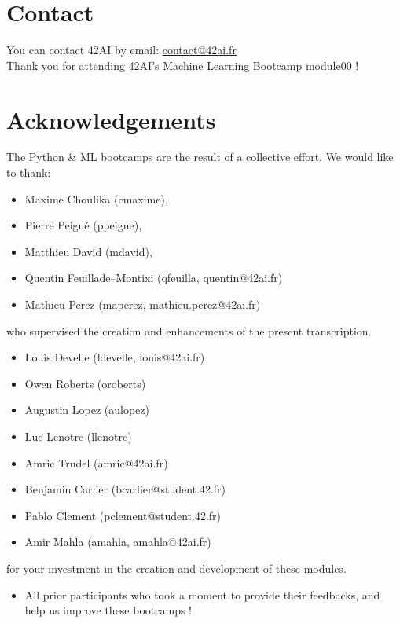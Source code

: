 \section*{Contact}
You can contact 42AI by email: \href{mailto:contact@42ai.fr}{contact@42ai.fr}\\
\newline
Thank you for attending 42AI's Machine Learning Bootcamp module00 !

\section*{Acknowledgements}
The Python \& ML bootcamps are the result of a collective effort. We would like to thank:\\
\begin{itemize}
  \item Maxime Choulika (cmaxime),
  \item Pierre Peigné (ppeigne),
  \item Matthieu David (mdavid),
  \item Quentin Feuillade--Montixi (qfeuilla, quentin@42ai.fr)
  \item Mathieu Perez (maperez, mathieu.perez@42ai.fr)
\end{itemize}
who supervised the creation and enhancements of the present transcription.\\
\newline
\begin{itemize}
  \item Louis Develle (ldevelle, louis@42ai.fr)
  \item Owen Roberts (oroberts)
  \item Augustin Lopez (aulopez)
  \item Luc Lenotre (llenotre)
  \item Amric Trudel (amric@42ai.fr)
  \item Benjamin Carlier (bcarlier@student.42.fr)
  \item Pablo Clement (pclement@student.42.fr)
  \item Amir Mahla (amahla, amahla@42ai.fr)
\end{itemize}
for your investment in the creation and development of these modules.\\
\newline
\begin{itemize}
    \item All prior participants who took a moment to provide their feedbacks, and help us improve these bootcamps !
  \end{itemize}

\vfill
\doclicenseThis

